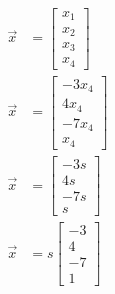 \documentclass{article}
\begin{document}
\begin{align*}
	\vec{x} & =
		\begin{bmatrix}
			x_1 \\
			x_2 \\
			x_3 \\
			x_4
		\end{bmatrix} \\
	\vec{x} & =
		\begin{bmatrix}
			-3x_4 \\
			4x_4 \\
			-7x_4 \\
			x_4
		\end{bmatrix} \\
	\vec{x} & =
		\begin{bmatrix}
			-3s \\
			4s \\
			-7s \\
			s
		\end{bmatrix} \\
	\vec{x} & =
		s \begin{bmatrix}
			-3 \\
			4 \\
			-7 \\
			1
		\end{bmatrix}
\end{align*}
\end{document}
